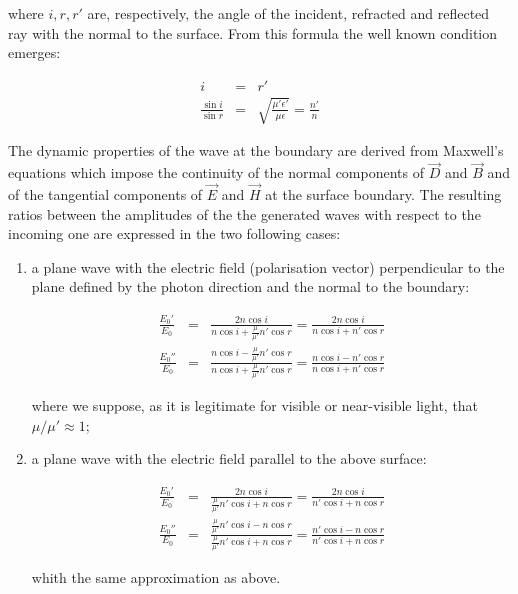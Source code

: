 where $i, r, r'$ are, respectively, the angle of the incident, refracted and
reflected ray with the normal to the surface. From this formula
the well known condition emerges:

\begin{eqnarray*}
i & = & r'  \\
\frac{\sin{i}}{\sin{r}} & = & \sqrt{\frac{\mu' \epsilon'}{\mu \epsilon}} =
\frac{n'}{n}
\end{eqnarray*}


The dynamic properties of the wave at the boundary are derived from Maxwell's
equations which impose the continuity of the normal components of $\vec{D}$ 
and $\vec{B}$ and of the tangential components of $\vec{E}$ and $\vec{H}$ 
at the surface boundary. The resulting ratios between the amplitudes of the
the generated waves with respect to the incoming one are 
expressed in the two following cases:

\begin{enumerate}
\item a plane wave with the electric 
field (polarisation vector) perpendicular to the plane defined by the
photon direction and the normal to the boundary:

\begin{eqnarray*}
\frac{E_{0}'}{E_{0}} & = & \frac{2 n \cos{i}}{n \cos{i} + \frac{\mu}{\mu'}
n' \cos{r}} = 
\frac{2 n \cos{i}}{n \cos{i} + n' \cos{r}} \\
\frac{E_{0}''}{E_{0}} & = & \frac{n \cos{i} - \frac{\mu}{\mu'} n' \cos{r}}
{n \cos{i} + \frac{\mu}{\mu'} n' \cos{r}} = 
\frac{n \cos{i} - n' \cos{r}} {n \cos{i} + n' \cos{r}}
\end{eqnarray*}

where we suppose, as it is legitimate for visible or near-visible light, that
$\mu/\mu' \approx 1$;

\item a plane wave with the electric
field parallel to the above surface: 

\begin{eqnarray*}
\frac{E_{0}'}{E_{0}} & = & \frac{2 n \cos{i}}
{\frac{\mu}{\mu'} n' \cos{i} + n \cos{r}} =
\frac{2 n \cos{i}} {n' \cos{i} + n \cos{r}} \\
\frac{E_{0}''}{E_{0}} & = & \frac{\frac{\mu}{\mu'} n' \cos{i} 
- n \cos{r}}{\frac{\mu}{\mu'} n' \cos{i} + n \cos{r}} = 
\frac{n' \cos{i} - n \cos{r}}{n' \cos{i} + n \cos{r}}
\end{eqnarray*}

whith the same approximation as above.

\end{enumerate}


